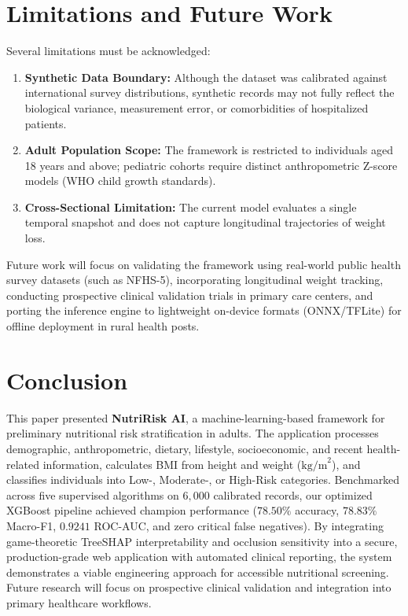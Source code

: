 \documentclass[conference]{IEEEtran}
\begin{document}
\section{Limitations and Future Work}
\label{sec:limitations}
Several limitations must be acknowledged:
\begin{enumerate}
    \item \textbf{Synthetic Data Boundary:} Although the dataset was calibrated against international survey distributions, synthetic records may not fully reflect the biological variance, measurement error, or comorbidities of hospitalized patients.
    \item \textbf{Adult Population Scope:} The framework is restricted to individuals aged 18 years and above; pediatric cohorts require distinct anthropometric Z-score models (WHO child growth standards).
    \item \textbf{Cross-Sectional Limitation:} The current model evaluates a single temporal snapshot and does not capture longitudinal trajectories of weight loss.
\end{enumerate}

Future work will focus on validating the framework using real-world public health survey datasets (such as NFHS-5), incorporating longitudinal weight tracking, conducting prospective clinical validation trials in primary care centers, and porting the inference engine to lightweight on-device formats (ONNX/TFLite) for offline deployment in rural health posts.

\section{Conclusion}
\label{sec:conclusion}
This paper presented \textbf{NutriRisk AI}, a machine-learning-based framework for preliminary nutritional risk stratification in adults. The application processes demographic, anthropometric, dietary, lifestyle, socioeconomic, and recent health-related information, calculates BMI from height and weight ($\text{kg/m}^2$), and classifies individuals into Low-, Moderate-, or High-Risk categories. Benchmarked across five supervised algorithms on $6{,}000$ calibrated records, our optimized XGBoost pipeline achieved champion performance ($78.50\%$ accuracy, $78.83\%$ Macro-F1, $0.9241$ ROC-AUC, and zero critical false negatives). By integrating game-theoretic TreeSHAP interpretability and occlusion sensitivity into a secure, production-grade web application with automated clinical reporting, the system demonstrates a viable engineering approach for accessible nutritional screening. Future research will focus on prospective clinical validation and integration into primary healthcare workflows.



\end{document}
